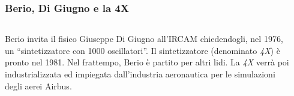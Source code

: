 \begin{frame}
    \frametitle{Berio, Di Giugno e la 4X} 

    \begin{columns}[T]
        \begin{column}{0.6\textwidth}
            Berio invita il fisico Giuseppe Di Giugno all'IRCAM chiedendogli,
            nel 1976, un ``sintetizzatore con 1000 oscillatori''. Il
            sintetizzatore (denominato \emph{4X}) \`e pronto nel 1981.
            Nel frattempo, Berio \`e partito per altri lidi. 
            La \emph{4X} verr\`a poi industrializzata ed impiegata dall'industria aeronautica 
            per le simulazioni degli aerei Airbus.
        \end{column}
        \begin{column}{0.4\textwidth}
            \\
        \end{column}
    \end{columns}
\end{frame}


